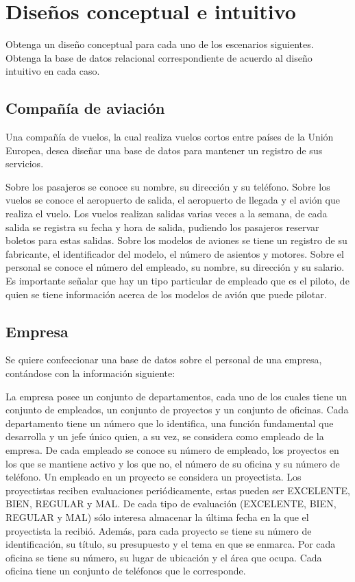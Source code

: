 \section{Dise\~nos conceptual e intuitivo}

Obtenga un dise\~no conceptual para cada uno de los escenarios siguientes. Obtenga la base de datos relacional correspondiente de acuerdo al dise\~no intuitivo en cada caso.

\subsection{Compa\~n\'ia de aviaci\'on}
Una compa\~n\'ia de vuelos, la cual realiza vuelos cortos entre pa\'ises de la Uni\'on Europea, desea dise\~nar una base de datos para mantener un registro de sus servicios.

Sobre los pasajeros se conoce su nombre, su direcci\'on y su tel\'efono. Sobre los vuelos se conoce el aeropuerto de salida, el aeropuerto de llegada y el avi\'on que realiza el vuelo. Los vuelos realizan salidas varias veces a la semana, de cada salida se registra su fecha y hora de salida, pudiendo los pasajeros reservar boletos para estas salidas. Sobre los modelos de aviones se tiene un registro de su
fabricante, el identificador del modelo, el n\'umero de asientos y motores. Sobre el personal se conoce el n\'umero del empleado, su nombre, su direcci\'on y su salario. Es importante se\~nalar que hay un tipo particular de empleado que es el piloto, de quien se tiene informaci\'on acerca de los modelos de avi\'on que puede pilotar.

\subsection{Empresa}
Se quiere confeccionar una base de datos sobre el personal de una empresa, cont\'andose con la informaci\'on siguiente:

La empresa posee un conjunto de departamentos, cada uno de los cuales tiene un conjunto de empleados, un conjunto de proyectos y un conjunto de oficinas. Cada departamento tiene un n\'umero que lo identifica, una funci\'on fundamental que desarrolla y un jefe \'unico quien, a su vez, se considera como empleado de la empresa. De cada empleado se conoce su n\'umero de empleado, los proyectos en los que se mantiene activo y los que no, el n\'umero de su oficina y su n\'umero de tel\'efono. Un empleado en un proyecto se considera un proyectista. Los proyectistas reciben evaluaciones peri\'odicamente, estas pueden ser EXCELENTE, BIEN, REGULAR y MAL. De cada tipo de evaluaci\'on (EXCELENTE, BIEN, REGULAR y MAL) s\'olo interesa almacenar la \'ultima fecha en la que el proyectista la recibi\'o. Adem\'as, para cada proyecto se tiene su n\'umero de identificaci\'on, su t\'itulo, su presupuesto y el tema en que se enmarca. Por cada oficina se tiene su n\'umero, su lugar de ubicaci\'on y el \'area que ocupa. Cada oficina tiene un conjunto de tel\'efonos que le corresponde.


